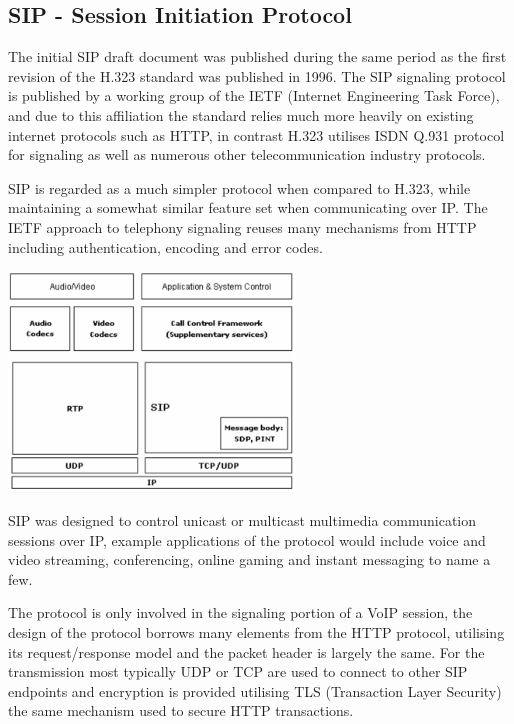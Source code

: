 \subsection{SIP - Session Initiation Protocol}
The initial SIP draft document was published during the same period as the first revision of the H.323 standard was published in 1996. The SIP signaling protocol is published by a working group of the IETF (Internet Engineering Task Force), and due to this affiliation the standard relies much more heavily on existing internet protocols such as HTTP, in contrast H.323 utilises ISDN Q.931 protocol for signaling as well as numerous other telecommunication industry protocols.

SIP is regarded as a much simpler protocol when compared to H.323\cite{paper:miroslavvozna}, while maintaining a somewhat similar feature set\cite{paper:SchulzrinnRosenber} when communicating over IP.  The IETF approach to telephony signaling reuses many mechanisms from HTTP including authentication, encoding and error codes.

\begin{center}
	\includegraphics[width=3in]{images/sip_protocol_suite.png}
\end{center}

SIP was designed to control unicast or multicast multimedia communication sessions over IP, example applications of the protocol would include voice and video streaming, conferencing, online gaming and instant messaging to name a few.

The protocol is only involved in the signaling portion of a VoIP session, the design of the protocol borrows many elements from the HTTP protocol, utilising its request/response model and the packet header is largely the same. For the transmission most typically UDP or TCP are used to connect to other SIP endpoints and encryption is provided utilising TLS (Transaction Layer Security) the same mechanism used to secure HTTP transactions.

